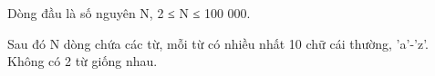 Dòng đầu là số nguyên N, 2 ≤ N ≤ 100 000.

Sau đó N dòng chứa các từ, mỗi từ có nhiều nhất 10 chữ cái thường, 'a'-'z'. Không có 2 từ giống nhau.